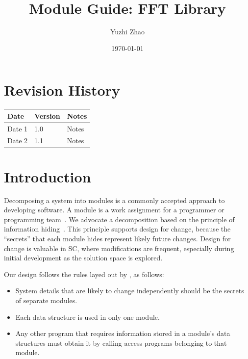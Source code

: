 \documentclass[12pt, titlepage]{article}
\begin{document}
\title{Module Guide: FFT Library} 
\author{Yuzhi Zhao }
\date{\today}

\maketitle


\section{Revision History}

\begin{tabularx}{\textwidth}{p{3cm}p{2cm}X}
\toprule {\bf Date} & {\bf Version} & {\bf Notes}\\
\midrule
Date 1 & 1.0 & Notes\\
Date 2 & 1.1 & Notes\\
\bottomrule
\end{tabularx}

\newpage

\tableofcontents

\listoftables

\listoffigures

\newpage


\section{Introduction}

Decomposing a system into modules is a commonly accepted approach to developing
software.  A module is a work assignment for a programmer or programming
team~\citep{ParnasEtAl1984}.  We advocate a decomposition
based on the principle of information hiding~\citep{Parnas1972a}.  This
principle supports design for change, because the ``secrets'' that each module
hides represent likely future changes.  Design for change is valuable in SC,
where modifications are frequent, especially during initial development as the
solution space is explored.  

Our design follows the rules layed out by \citet{ParnasEtAl1984}, as follows:
\begin{itemize}
\item System details that are likely to change independently should be the
  secrets of separate modules.
\item Each data structure is used in only one module.
\item Any other program that requires information stored in a module's data
  structures must obtain it by calling access programs belonging to that module.
\end{itemize}
\end{document}
